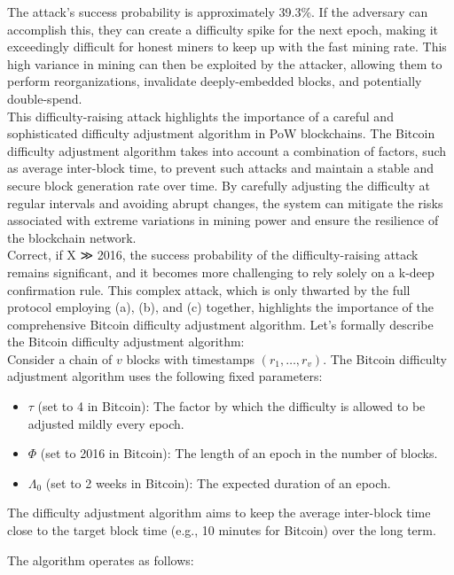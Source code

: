 The attack's success probability is approximately 39.3\%. If the adversary can accomplish this, they can create a difficulty spike for the next epoch, making it exceedingly difficult for honest miners to keep up with the fast mining rate. This high variance in mining can then be exploited by the attacker, allowing them to perform reorganizations, invalidate deeply-embedded blocks, and potentially double-spend.\\
This difficulty-raising attack highlights the importance of a careful and sophisticated difficulty adjustment algorithm in PoW blockchains. The Bitcoin difficulty adjustment algorithm takes into account a combination of factors, such as average inter-block time, to prevent such attacks and maintain a stable and secure block generation rate over time. By carefully adjusting the difficulty at regular intervals and avoiding abrupt changes, the system can mitigate the risks associated with extreme variations in mining power and ensure the resilience of the blockchain network.\\
Correct, if X ≫ 2016, the success probability of the difficulty-raising attack remains significant, and it becomes more challenging to rely solely on a k-deep confirmation rule. This complex attack, which is only thwarted by the full protocol employing (a), (b), and (c) together, highlights the importance of the comprehensive Bitcoin difficulty adjustment algorithm. Let's formally describe the Bitcoin difficulty adjustment algorithm:\\
Consider a chain of $v$ blocks with timestamps $(r_1, \ldots, r_v)$. The Bitcoin difficulty adjustment algorithm uses the following fixed parameters:

\begin{itemize}
	\item $\tau$ (set to 4 in Bitcoin): The factor by which the difficulty is allowed to be adjusted mildly every epoch.
	\item $\Phi$ (set to 2016 in Bitcoin): The length of an epoch in the number of blocks.
	\item $\Lambda_0$ (set to 2 weeks in Bitcoin): The expected duration of an epoch.
\end{itemize}

The difficulty adjustment algorithm aims to keep the average inter-block time close to the target block time (e.g., 10 minutes for Bitcoin) over the long term.

The algorithm operates as follows:

